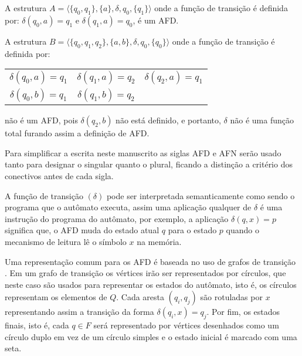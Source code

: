 \begin{exem}\label{exe:AFD}
	A estrutura $A = \langle \{q_0, q_1\}, \{a\}, \delta, q_0, \{q_1\} \rangle$ onde a função de transição é definida por: $\delta(q_0, a) = q_1$ e $\delta(q_1, a) = q_0$, é um AFD.
\end{exem}

\begin{exem}\label{exe:NaoEAFD}
	A estrutura $B = \langle \{q_0, q_1, q_2\}, \{a, b\}, \delta, q_0, \{q_0\} \rangle$ onde a função de transição é definida por:
	\begin{table*}[h]
		\centering
		\begin{tabular}{ccc}
			$\delta(q_0, a) = q_1$ & $\delta(q_1, a) = q_2$ & $\delta(q_2, a) = q_1$\\
			$\delta(q_0, b) = q_1$ & $\delta(q_1, b) = q_2$ & 
		\end{tabular}
	\end{table*}

	\noindent não é um AFD, pois $\delta(q_2, b)$ não está definido, e portanto, $\delta$ não é uma função total furando assim a definição de AFD.
\end{exem}

\begin{rema}\label{rema:plural1}
	Para simplificar a escrita neste manuscrito as siglas AFD e AFN serão usado tanto para designar o singular quanto o plural, ficando a distinção a critério dos conectivos antes de cada sigla.
\end{rema}

A função de transição $(\delta)$ pode ser interpretada semanticamente como sendo o programa que o autômato executa, assim uma aplicação qualquer de $\delta$ é uma instrução do programa do autômato, por exemplo, a aplicação $\delta(q, x) = p$ significa que, o AFD muda do estado atual $q$ para o estado $p$ quando o mecanismo de leitura lê o símbolo $x$ na memória. 

Uma representação comum para os AFD é baseada no uso de grafos de transição \cite{valdi2020phd}. Em um grafo de transição os vértices irão ser representados por círculos, que neste caso são usados para representar os estados do autômato, isto é, os círculos representam os elementos de $Q$. Cada aresta $(q_i, q_j)$ são rotuladas por $x$ representando assim a transição da forma $\delta(q_i, x) = q_j$. Por fim, os estados finais, isto é, cada $q \in F$ será representado por vértices desenhados como um círculo duplo em vez de um círculo simples e o estado inicial é marcado com uma seta.

